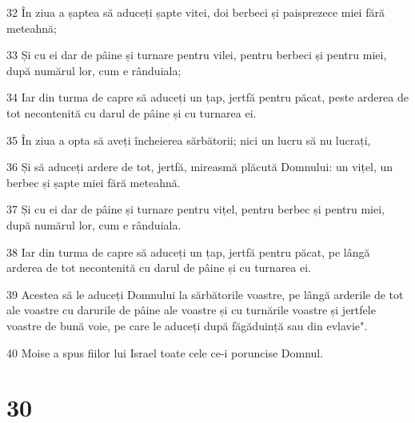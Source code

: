 \par 32 În ziua a șaptea să aduceți șapte vitei, doi berbeci și paisprezece miei fără meteahnă;
\par 33 Și cu ei dar de pâine și turnare pentru vilei, pentru berbeci și pentru miei, după numărul lor, cum e rânduiala;
\par 34 Iar din turma de capre să aduceți un țap, jertfă pentru păcat, peste arderea de tot necontenită cu darul de pâine și cu turnarea ei.
\par 35 În ziua a opta să aveți încheierea sărbătorii; nici un lucru să nu lucrați,
\par 36 Și să aduceți ardere de tot, jertfă, mireasmă plăcută Domnului: un vițel, un berbec și șapte miei fără meteahnă.
\par 37 Și cu ei dar de pâine și turnare pentru vițel, pentru berbec și pentru miei, după numărul lor, cum e rânduiala.
\par 38 Iar din turma de capre să aduceți un țap, jertfă pentru păcat, pe lângă arderea de tot necontenită cu darul de pâine și cu turnarea ei.
\par 39 Acestea să le aduceți Domnului la sărbătorile voastre, pe lângă arderile de tot ale voastre cu darurile de pâine ale voastre și cu turnările voastre și jertfele voastre de bună voie, pe care le aduceți după făgăduință sau din evlavie".
\par 40 Moise a spus fiilor lui Israel toate cele ce-i poruncise Domnul.

\chapter{30}

